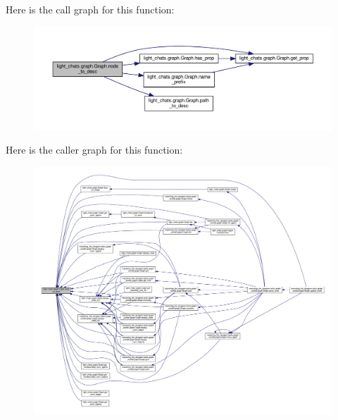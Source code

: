 Here is the call graph for this function\+:
\nopagebreak
\begin{figure}[H]
\begin{center}
\leavevmode
\includegraphics[width=350pt]{classlight__chats_1_1graph_1_1Graph_a9ed5168f4d2a93b6a9f3f3ddd07660d4_cgraph}
\end{center}
\end{figure}
Here is the caller graph for this function\+:
\nopagebreak
\begin{figure}[H]
\begin{center}
\leavevmode
\includegraphics[width=350pt]{classlight__chats_1_1graph_1_1Graph_a9ed5168f4d2a93b6a9f3f3ddd07660d4_icgraph}
\end{center}
\end{figure}
\mbox{\label{classlight__chats_1_1graph_1_1Graph_ae0b96f3393dd176f10c3f154649cdf25}} 

